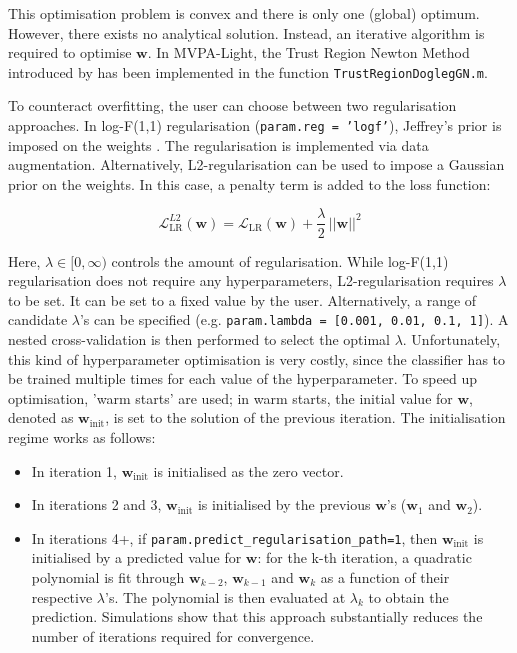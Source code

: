 \documentclass[utf8]{frontiersSCNS} %
\newcommand{\w}{\mathbf{w}}
\renewcommand{\L}{\mathcal{L}}
\newcommand{\mvpa}{MVPA-Light}
\newcommand{\ttt}[1]{\texttt{#1}}
\begin{document}
This optimisation problem is convex and there is only one (global) optimum. However, there exists no analytical solution. Instead, an iterative algorithm is required to optimise $\w$. In \mvpa{}, the Trust Region Newton Method introduced by \cite{Lin2007TrustRegression} has been implemented in the function \ttt{TrustRegionDoglegGN.m}.

To counteract overfitting, the user can choose between two regularisation approaches. In log-F(1,1) regularisation (\ttt{param.reg = 'logf'}), Jeffrey's prior is imposed on the weights \citep{Firth1993BiasEstimates,Rahman2017PerformanceData.,King2001}. The regularisation is implemented via data augmentation. Alternatively, L2-regularisation can be used to impose a Gaussian prior on the weights. In this case, a penalty term is added to the loss function:

\begin{equation}
\label{eq:logreg_loss_function}
\L_\text{LR}^{L2}(\w) = \L_\text{LR}(\w) + \frac{\lambda}{2}\, ||\w||^2
\end{equation}

Here, $\lambda\in [0,\infty)$ controls the amount of regularisation. While log-F(1,1) regularisation does not require any hyperparameters, L2-regularisation requires $\lambda$ to be set. It can be set to a fixed value by the user. Alternatively, a range of candidate $\lambda$'s can be specified (e.g. \ttt{param.lambda = [0.001, 0.01, 0.1, 1]}). A nested cross-validation is then performed to select the optimal $\lambda$.
Unfortunately, this kind of hyperparameter optimisation is very costly, since the classifier has to be trained multiple times for each value of the hyperparameter. To speed up optimisation, 'warm starts' are used; in warm starts, the initial value for $\w$, denoted as  $\w_\text{init}$, is set to the solution of the previous iteration. The initialisation regime works as follows:

\begin{itemize}
    \item In iteration 1, $\w_\text{init}$ is initialised as the zero vector.
    \item In iterations 2 and 3, $\w_\text{init}$ is initialised by the previous $\w$'s ($\w_1$ and $\w_2$).
    \item In iterations 4+, if \ttt{param.predict\_regularisation\_path=1}, then $\w_\text{init}$ is initialised by a predicted value for $\w$: for the
  k-th iteration, a quadratic polynomial is fit through $\w_{k-2}$, $\w_{k-1}$ and $\w_k$ as a function of their respective $\lambda$'s. The polynomial is then evaluated at $\lambda_k$ to obtain the prediction. Simulations show that this approach substantially reduces the number of iterations required for convergence.
\end{itemize}{}
\end{document}
